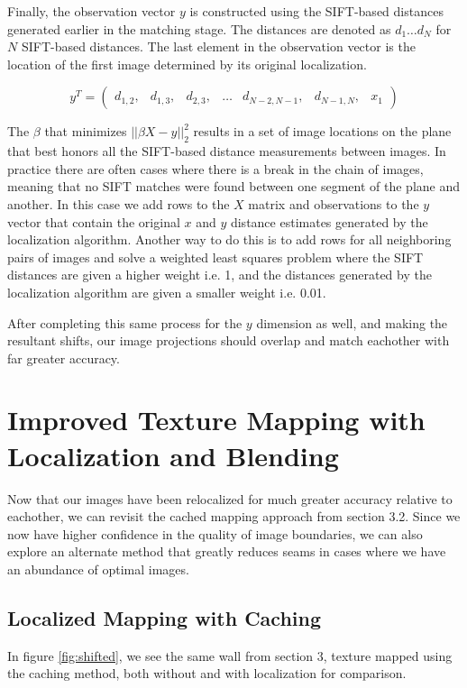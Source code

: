 \documentclass[10pt,twocolumn,letterpaper]{article}
\begin{document}
Finally, the observation vector $y$ is constructed using the
SIFT-based distances generated earlier in the matching stage. The
distances are denoted as $d_1 \dots d_N$ for $N$ SIFT-based
distances. The last element in the observation vector is the location of the first image determined by its original localization.

\[
y^T =
\begin{pmatrix}
  d_{1,2}, &d_{1,3}, &d_{2,3}, &\hdots &d_{N-2,N-1}, &d_{N-1,N}, &x_1
\end{pmatrix}
\]

The $\beta$ that minimizes $||\beta X - y||_2^2$ results in a set of
image locations on the plane that best honors all the SIFT-based
distance measurements between images. In practice there are often cases where there is a
break in the chain of images, meaning that no SIFT matches were found
between one segment of the plane and another. In this case we add rows
to the $X$ matrix and observations to the $y$ vector that contain the
original $x$ and $y$ distance estimates generated by the localization
algorithm. Another way to do this is to add rows for all neighboring
pairs of images and solve a weighted least squares problem where the
SIFT distances are given a higher weight i.e. 1, and the distances
generated by the localization algorithm are given a smaller weight
i.e. 0.01.

After completing this same process for the $y$ dimension as well, and making the resultant shifts, our image projections should overlap and match eachother with far greater accuracy. 


\section{Improved Texture Mapping with Localization and Blending}
Now that our images have been relocalized for much greater accuracy relative to eachother, we can revisit the cached mapping approach from section 3.2. Since we now have higher confidence in the quality of image boundaries, we can also explore an alternate method that greatly reduces seams in cases where we have an abundance of optimal images.

\subsection{Localized Mapping with Caching}
In figure \ref{fig:shifted}, we see the same wall from section 3,
texture mapped using the caching method, both without and with
localization for comparison.
\end{document}
